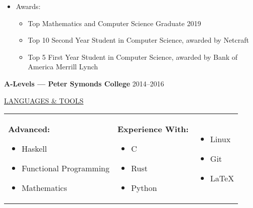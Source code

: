 \documentclass[10pt]{letter}
\newif\iflong
\begin{document}
\begin{itemize}
    \item Awards:
          \begin{itemize}
            \setlength\itemsep{0pt}
            \item Top Mathematics and Computer Science Graduate 2019
            \item Top 10 Second Year Student in Computer Science, awarded by Netcraft
            \item Top 5 First Year Student in Computer Science, awarded by Bank of America Merrill Lynch
          \end{itemize}
  \end{itemize}
\fi

\textbf{A-Levels --- Peter Symonds College} \hfill 2014--2016

\iflong
  \vspace{-5pt}
  \begin{itemize}
    \setlength\itemsep{0pt}
    \item Mathematics A*
    \item Further Mathematics A
    \item Physics A
    \item (AS) Economics A
  \end{itemize}
\fi


\vspace{10pt}

\uline{{\large LANGUAGES \& TOOLS}\hfill}

\vspace{5pt}

\begin{tabular}{p{}p{}p{}}
  \textbf{Advanced:}
  \begin{itemize}
    \setlength\itemsep{0pt}
    \item Haskell
    \item Functional Programming
    \item Mathematics
  \end{itemize}

   &
  \textbf{Experience With:}
  \begin{itemize}
    \setlength\itemsep{0pt}
    \item C
    \item Rust
    \item Python
  \end{itemize}

   &
  \begin{itemize}
    \setlength\itemsep{0pt}
    \item Linux
    \item Git
    \item \LaTeX{}
  \end{itemize}
\end{tabular}
\end{document}
